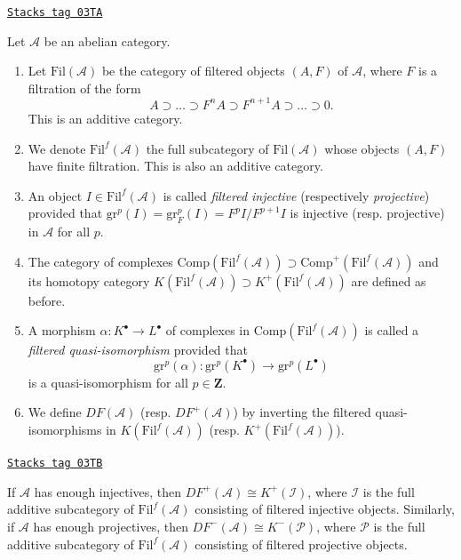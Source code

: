 \begin{definition}[Filtered]
\label{trace-definition-filtered}
\href{https://stacks.math.columbia.edu/tag/03TA}{\texttt{Stacks tag 03TA}}

Let $\mathcal{A}$ be an abelian category.
\begin{enumerate}
\item Let $\text{Fil}(\mathcal{A})$ be the category of filtered objects
$(A, F)$ of $\mathcal{A}$, where $F$ is a filtration of the form
$$
A \supset \ldots \supset F^n A \supset F^{n+1}A \supset \ldots
\supset 0.
$$
This is an additive category.
\item We denote $\text{Fil}^f(\mathcal{A})$ the full
subcategory of $\text{Fil}(\mathcal{A})$ whose objects $(A, F)$ have finite
filtration. This is also an additive category.
\item An object $I \in \text{Fil}^f(\mathcal{A})$ is called
{\it filtered injective} (respectively {\it projective}) provided
that $\text{gr}^p(I) = \text{gr}_F^p(I) = F^pI/F^{p+1}I$ is injective
(resp. projective) in $\mathcal{A}$ for all $p$.
\item The category of complexes
$\text{Comp}(\text{Fil}^f(\mathcal{A})) \supset
\text{Comp}^+(\text{Fil}^f(\mathcal{A}))$
and its homotopy category
$K(\text{Fil}^f(\mathcal{A})) \supset K^+(\text{Fil}^f(\mathcal A))$
are defined as before.
\item A morphism $\alpha : K^\bullet \to L^\bullet$ of complexes in
$\text{Comp}(\text{Fil}^f(\mathcal{A}))$ is called a
{\it filtered quasi-isomorphism} provided that
$$
\text{gr}^p(\alpha): \text{gr}^p(K^\bullet) \to \text{gr}^p(L^\bullet)
$$
is a quasi-isomorphism for all $p \in \mathbf{Z}$.
\item We define $DF(\mathcal{A})$ (resp. $DF^+(\mathcal{A})$)
by inverting the filtered quasi-isomorphisms in
$K(\text{Fil}^f(\mathcal{A}))$ (resp. $K^+(\text{Fil}^f(\mathcal{A}))$).
\end{enumerate}
\end{definition}

\begin{lemma}
\label{trace-lemma-filtered-derived-category}
\href{https://stacks.math.columbia.edu/tag/03TB}{\texttt{Stacks tag 03TB}}

If $\mathcal{A}$ has enough injectives, then $DF^+(\mathcal{A}) \cong
K^+(\mathcal{I})$, where $\mathcal{I}$ is the full additive subcategory of
$\text{Fil}^f(\mathcal{A})$ consisting of filtered injective objects.
Similarly, if $\mathcal{A}$ has enough projectives, then $DF^-(\mathcal{A})
\cong K^-(\mathcal{P})$, where $\mathcal P$ is the full additive subcategory of
$\text{Fil}^f(\mathcal{A})$ consisting of filtered projective objects.
\end{lemma}

